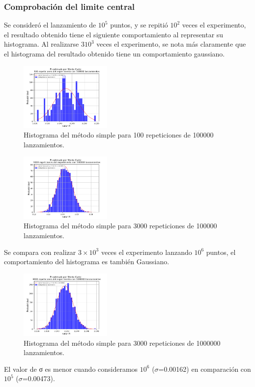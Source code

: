 \documentclass{rbf}
\begin{document}
\subsubsection{Comprobación del limite central}
Se consideró el lanzamiento de $10^5$ puntos, y se repitió $10^2$ veces el experimento, el resultado obtenido tiene el siguiente comportamiento al representar su histograma. Al realizarse $3 10^3$ veces el experimento, se nota más claramente que el histograma del resultado obtenido tiene un comportamiento gaussiano. 
\begin{figure}
 \centering
  \includegraphics[width=0.4\textwidth]{figures/MCn1e5m100.png}
	\caption{Histograma del método simple para 100 repeticiones de 100000 lanzamientos.}
 \label{buff}
\end{figure}

\begin{figure}[tbp!]
 \centering
  \includegraphics[width=0.4\textwidth]{figures/MCn1e5m3000.png}
	\caption{Histograma del método simple para 3000 repeticiones de 100000 lanzamientos.}
 \label{buff}
\end{figure}
Se compara con realizar $3×10^3$ veces el experimento lanzando $10^6$ puntos, el comportamiento del histograma es también Gaussiano.
\begin{figure}[tbp!]
 \centering
  \includegraphics[width=0.4\textwidth]{figures/MCn1e6m3000.png}
	\caption{Histograma del método simple para 3000 repeticiones de 1000000 lanzamientos.}
 \label{buff}
\end{figure}
El valor de σ es menor cuando consideramos $10^6$ ($\sigma$=0.00162) en comparación con $10^5$ ($\sigma$=0.00473). 
\end{document}
